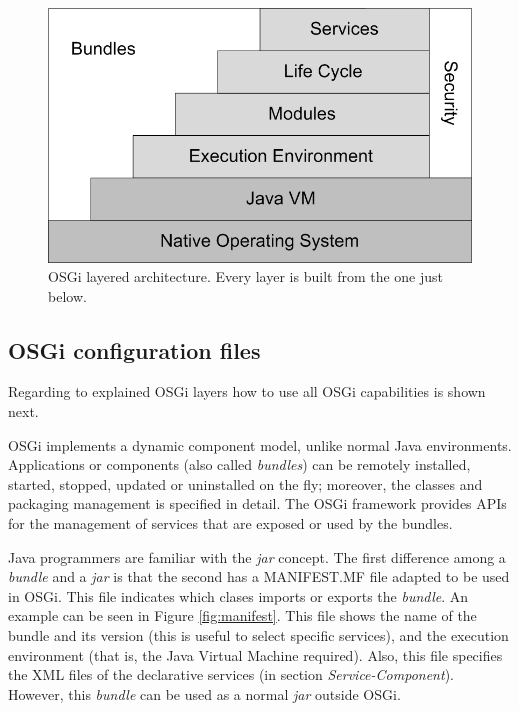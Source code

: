 \documentclass{sig-alternate}
\begin{document}
\begin{figure}[t] 
\begin{center} 
\includegraphics[scale=0.8]{images/osgi-oficial.eps} 
\end{center} 
\caption{OSGi layered architecture. Every layer is built from the one just below.} 
\label{fig:osgi-original} 
\end{figure}



\subsection{OSGi configuration files}
Regarding to explained OSGi layers how to use all OSGi capabilities is shown next. 

OSGi implements a dynamic component model, unlike normal Java
environments. Applications or components (also called
\emph{bundles}) can be remotely installed, started, stopped, updated
or uninstalled on the fly; moreover, the classes and
packaging management is specified in detail. The OSGi framework provides
APIs for the management of services that are exposed or used by the
bundles.

Java programmers are familiar with the {\em jar} concept. The first difference among a {\em bundle} and a {\em jar} is that the second has a MANIFEST.MF file adapted to be used in OSGi. This file indicates which clases imports or exports the {\em bundle}. An example can be seen in Figure \ref{fig:manifest}. This file shows the name of the bundle and its version (this is useful to select specific services), and the execution environment (that is, the Java Virtual Machine required). Also, this file specifies the XML files of the declarative services (in section {\em Service-Component}). However, this {\em bundle} can be used as a normal {\em jar} outside OSGi.
\end{document}
